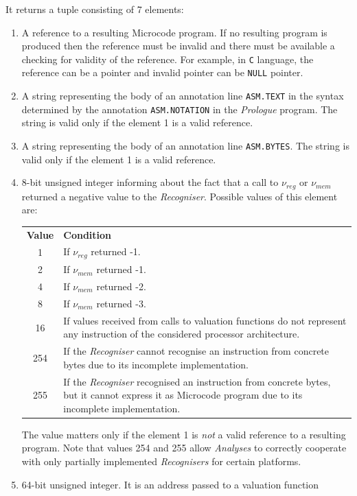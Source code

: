 \documentclass[10pt,twocolumn]{article}
\begin{document}
\noindent
It returns a tuple consisting of 7 elements:
\begin{enumerate}
\item A reference to a resulting Microcode program. If no resulting program is
produced then the reference must be invalid and there must be available a
checking for validity of the reference.  For example, in \texttt{C} language,
the reference can be a pointer and invalid pointer can be \texttt{NULL} pointer.
%
\item A string representing the body of an annotation line \texttt{ASM.TEXT} in
the syntax determined by the annotation \texttt{ASM.NOTATION} in the
\textit{Prologue} program. The string is valid only if the element 1 is a valid
reference. %
\item A string representing the body of an annotation line \texttt{ASM.BYTES}.
The string is valid only if the element 1 is a valid reference. %
\item 8-bit unsigned integer informing about the fact that a call to $
\nu_\mathit{reg} $ or $ \nu_\mathit{mem} $ returned a negative value to the
\textit{Recogniser}. Possible values of this element are:
\begin{center}
\begin{tabular}{cp{5.5cm}}
\textbf{Value} & \textbf{Condition} \\ %
1 & If $ \nu_\mathit{reg} $ returned -1. \\ %
2 & If $ \nu_\mathit{mem} $ returned -1. \\ %
4 & If $ \nu_\mathit{mem} $ returned -2. \\ %
8 & If $ \nu_\mathit{mem} $ returned -3. \\ %
16 & If values received from calls to valuation functions do not represent any
instruction of the considered processor architecture. \\ %
254 & If the \textit{Recogniser} cannot recognise an instruction from concrete
bytes due to its incomplete implementation. \\ %
255 & If the \textit{Recogniser} recognised an instruction from concrete bytes,
but it cannot express it as Microcode program due to its incomplete
implementation.
\end{tabular}
\end{center}
The value matters only if the element 1 is \emph{not} a valid reference to a
resulting program. Note that values 254 and 255 allow \textit{Analyses} to
correctly cooperate with only partially implemented \textit{Recognisers} for
certain platforms. %
\item 64-bit unsigned integer. It is an address passed to a valuation function

\end{enumerate}
\end{document}
